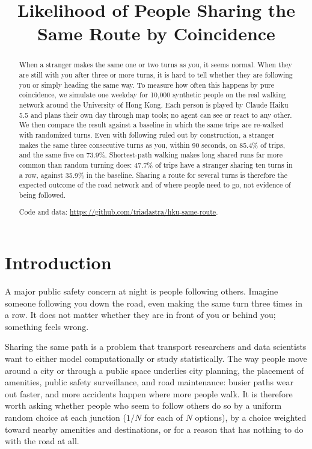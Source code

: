 \documentclass[9pt]{ieeeconf}
\title{Likelihood of People Sharing the Same Route by Coincidence}
\begin{document}
\maketitle

\begin{abstract}
When a stranger makes the same one or two turns as you, it seems normal. When they are still with you after three or more turns, it is hard to tell whether they are following you or simply heading the same way. To measure how often this happens by pure coincidence, we simulate one weekday for 10,000 synthetic people on the real walking network around the University of Hong Kong. Each person is played by Claude Haiku 5.5 and plans their own day through map tools; no agent can see or react to any other. We then compare the result against a baseline in which the same trips are re-walked with randomized turns. Even with following ruled out by construction, a stranger makes the same three consecutive turns as you, within 90 seconds, on 85.4\% of trips, and the same five on 73.9\%. Shortest-path walking makes long shared runs far more common than random turning does: 47.7\% of trips have a stranger sharing ten turns in a row, against 35.9\% in the baseline. Sharing a route for several turns is therefore the expected outcome of the road network and of where people need to go, not evidence of being followed.

Code and data: \url{https://github.com/triadastra/hku-same-route}.
\end{abstract}


\section{Introduction}
\label{sec:intro}
A major public safety concern at night is people following others. Imagine someone following you down the road, even making the same turn three times in a row. It does not matter whether they are in front of you or behind you; something feels wrong.

Sharing the same path is a problem that transport researchers and data scientists want to either model computationally or study statistically. The way people move around a city or through a public space underlies city planning, the placement of amenities, public safety surveillance, and road maintenance: busier paths wear out faster, and more accidents happen where more people walk. It is therefore worth asking whether people who seem to follow others do so by a uniform random choice at each junction ($1/N$ for each of $N$ options), by a choice weighted toward nearby amenities and destinations, or for a reason that has nothing to do with the road at all.
\end{document}
